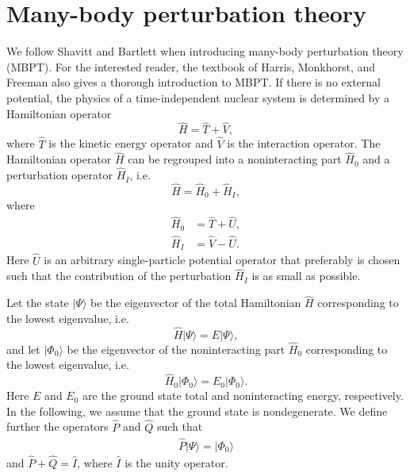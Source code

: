\documentclass[a4paper,12pt]{report}
\begin{document}
\section{Many-body perturbation theory}

We follow Shavitt and Bartlett \cite{bartlett_book} when introducing many-body perturbation theory (MBPT). For the interested reader, the textbook of Harris, Monkhorst, and Freeman \cite{harris} also gives a thorough introduction to MBPT. If there is no external potential, the physics of a time-independent nuclear system is determined by a Hamiltonian operator 
\begin{equation}
  \hat{H} = \hat{T} + \hat{V},
\end{equation}
where $\hat{T}$ is the kinetic energy operator and $\hat{V}$ is the interaction operator. The Hamiltonian operator $\hat{H}$ can be regrouped into a noninteracting part $\hat{H}_{0}$ and a perturbation operator $\hat{H}_{I}$, i.e.
\begin{equation}
  \hat{H} = \hat{H}_{0} + \hat{H}_{I},
\end{equation}
where
\begin{align}
  \hat{H}_{0} &= \hat{T} + \hat{U}, \\
  \hat{H}_{I} &= \hat{V} - \hat{U}.
\end{align}
Here $\hat{U}$ is an arbitrary single-particle potential operator that preferably is chosen such that the contribution of the perturbation $\hat{H}_{I}$ is as small as possible. 

Let the state $| \Psi \rangle $ be the eigenvector of the total Hamiltonian $\hat{H}$ corresponding to the lowest eigenvalue, i.e.
\begin{equation}
  \hat{H}| \Psi \rangle = E| \Psi \rangle, 
\end{equation}
and let $| \Phi_{0}\rangle $ be the eigenvector of the noninteracting part $\hat{H}_{0}$ corresponding to the lowest eigenvalue, i.e.
\begin{equation}
  \hat{H}_{0}|\Phi_{0}\rangle = E_{0}|\Phi_{0}\rangle . 
\end{equation}
Here $E$ and $E_{0}$ are the ground state total and noninteracting energy, respectively. In the following, we assume that the ground state is nondegenerate. We define further the operators $\hat{P}$ and $\hat{Q}$ such that
\begin{align}
  \hat{P}| \Psi \rangle = |\Phi_{0}\rangle 
\end{align}
and $\hat{P} + \hat{Q} = \hat{I}$, where $\hat{I}$ is the unity operator.
\end{document}
